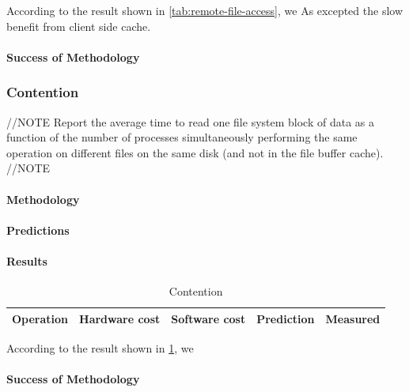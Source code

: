 According to the result shown in \ref{tab:remote-file-access}, we
As excepted the slow benefit from client side cache.
\paragraph{Success of Methodology}



\subsubsection{Contention}
//NOTE
Report the average time to read one file system block of data as a function of the number of processes simultaneously performing the same operation on different files on the same disk (and not in the file buffer cache).
//NOTE

\paragraph{Methodology}

\paragraph{Predictions}
\paragraph{Results}
\begin{table}
\begin{center}
\begin{tabular}{| l | l | l | l | l |}
\hline
Operation & Hardware cost & Software cost & Prediction & Measured \\
\hline
\end{tabular}
\end{center}
\caption{Contention\label{tab:contention}}
\end{table}

According to the result shown in \ref{tab:contention}, we

\paragraph{Success of Methodology}


